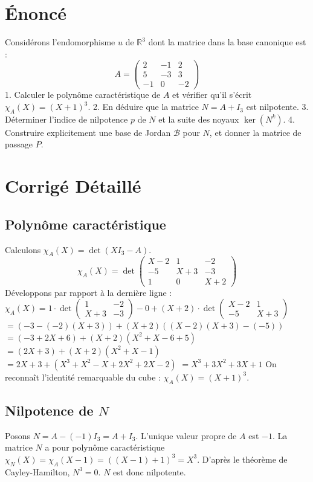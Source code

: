 \documentclass[11pt,a4paper]{article}
\begin{document}
\section{Énoncé}
Considérons l'endomorphisme $u$ de $\mathbb{R}^3$ dont la matrice dans la base canonique est :
$$A = \begin{pmatrix} 2 & -1 & 2 \\ 5 & -3 & 3 \\ -1 & 0 & -2 \end{pmatrix}$$
1. Calculer le polynôme caractéristique de $A$ et vérifier qu'il s'écrit $\chi_A(X) = (X+1)^3$.
2. En déduire que la matrice $N = A + I_3$ est nilpotente.
3. Déterminer l'indice de nilpotence $p$ de $N$ et la suite des noyaux $\ker(N^k)$.
4. Construire explicitement une base de Jordan $\mathcal{B}$ pour $N$, et donner la matrice de passage $P$.

\section{Corrigé Détaillé}

\subsection{Polynôme caractéristique}
Calculons $\chi_A(X) = \det(X I_3 - A)$.
$$\chi_A(X) = \det \begin{pmatrix} X - 2 & 1 & -2 \\ -5 & X + 3 & -3 \\ 1 & 0 & X + 2 \end{pmatrix}$$
Développons par rapport à la dernière ligne :
$\chi_A(X) = 1 \cdot \det \begin{pmatrix} 1 & -2 \\ X+3 & -3 \end{pmatrix} - 0 + (X+2) \cdot \det \begin{pmatrix} X-2 & 1 \\ -5 & X+3 \end{pmatrix}$
$= (-3 - (-2)(X+3)) + (X+2)((X-2)(X+3) - (-5))$
$= (-3 + 2X + 6) + (X+2)(X^2 + X - 6 + 5)$
$= (2X + 3) + (X+2)(X^2 + X - 1)$
$= 2X + 3 + (X^3 + X^2 - X + 2X^2 + 2X - 2)$
$= X^3 + 3X^2 + 3X + 1$
On reconnaît l'identité remarquable du cube : $\chi_A(X) = (X + 1)^3$.

\subsection{Nilpotence de $N$}
Posons $N = A - (-1)I_3 = A + I_3$.
L'unique valeur propre de $A$ est $-1$.
La matrice $N$ a pour polynôme caractéristique $\chi_N(X) = \chi_A(X - 1) = ((X-1)+1)^3 = X^3$.
D'après le théorème de Cayley-Hamilton, $N^3 = 0$. $N$ est donc nilpotente.
\end{document}
